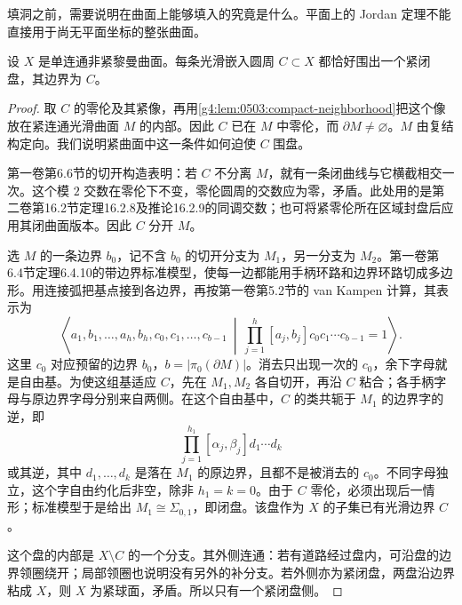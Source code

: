 填洞之前，需要说明在曲面上能够填入的究竟是什么。平面上的 Jordan 定理不能直接用于尚无平面坐标的整张曲面。

\begin{lemma}
	\label{g4:lem:0503:null-circle}
	设 \(X\) 是单连通非紧黎曼曲面。每条光滑嵌入圆周 \(C\subset X\) 都恰好围出一个紧闭盘，其边界为 \(C\)。
\end{lemma}
\begin{proof}
	取 \(C\) 的零伦及其紧像，再用\cref{g4:lem:0503:compact-neighborhood}把这个像放在紧连通光滑曲面 \(M\) 的内部。因此 \(C\) 已在 \(M\) 中零伦，而 \(\partial M\ne\varnothing\)。\(M\) 由复结构定向。我们说明紧曲面中这一条件如何迫使 \(C\) 围盘。

	第一卷第6.6节的切开构造表明：若 \(C\) 不分离 \(M\)，就有一条闭曲线与它横截相交一次。这个模 \(2\) 交数在零伦下不变，零伦圆周的交数应为零，矛盾。此处用的是第二卷第16.2节定理16.2.8及推论16.2.9的同调交数；也可将紧零伦所在区域封盘后应用其闭曲面版本。因此 \(C\) 分开 \(M\)。

	选 \(M\) 的一条边界 \(b_0\)，记不含 \(b_0\) 的切开分支为 \(M_1\)，另一分支为 \(M_2\)。第一卷第6.4节定理6.4.10的带边界标准模型，使每一边都能用手柄环路和边界环路切成多边形。用连接弧把基点接到各边界，再按第一卷第5.2节的 van Kampen 计算，其表示为
	\[
		\left\langle a_1,b_1,\ldots,a_h,b_h,c_0,c_1,\ldots,c_{b-1}\ \middle|\
		\prod_{j=1}^{h}[a_j,b_j]c_0c_1\cdots c_{b-1}=1\right\rangle.
	\]
	这里 \(c_0\) 对应预留的边界 \(b_0\)，\(b=|\pi_0(\partial M)|\)。消去只出现一次的 \(c_0\)，余下字母就是自由基。为使这组基适应 \(C\)，先在 \(M_1,M_2\) 各自切开，再沿 \(C\) 粘合；各手柄字母与原边界字母分别来自两侧。在这个自由基中，\(C\) 的类共轭于 \(M_1\) 的边界字的逆，即
	\[
		\prod_{j=1}^{h_1}[\alpha_j,\beta_j]d_1\cdots d_k
	\]
	或其逆，其中 \(d_1,\ldots,d_k\) 是落在 \(M_1\) 的原边界，且都不是被消去的 \(c_0\)。不同字母独立，这个字自由约化后非空，除非 \(h_1=k=0\)。由于 \(C\) 零伦，必须出现后一情形；标准模型于是给出 \(M_1\cong\Sigma_{0,1}\)，即闭盘。该盘作为 \(X\) 的子集已有光滑边界 \(C\)。

	这个盘的内部是 \(X\setminus C\) 的一个分支。其外侧连通：若有道路经过盘内，可沿盘的边界领圈绕开；局部领圈也说明没有另外的补分支。若外侧亦为紧闭盘，两盘沿边界粘成 \(X\)，则 \(X\) 为紧球面，矛盾。所以只有一个紧闭盘侧。
\end{proof}

